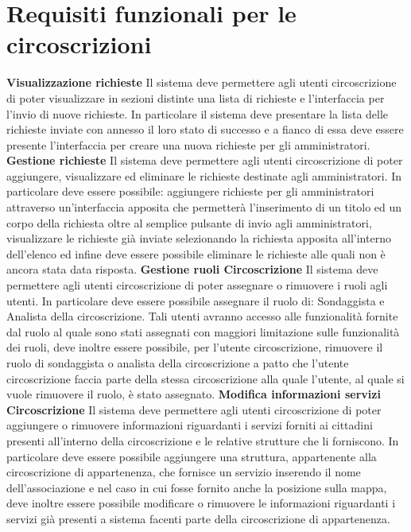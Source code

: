     \section{Requisiti funzionali per le circoscrizioni}
        \begin{rfList}
            \rfItem \textbf{Visualizzazione richieste} Il sistema deve permettere agli utenti circoscrizione di poter visualizzare in sezioni distinte una lista di richieste e l'interfaccia per l'invio di nuove richieste. In particolare il sistema deve presentare la lista delle richieste inviate con annesso il loro stato di successo e a fianco di essa deve essere presente l'interfaccia per creare una nuova richieste per gli amministratori.
            \rfItem \textbf{Gestione richieste} Il sistema deve permettere agli utenti circoscrizione di poter aggiungere, visualizzare ed eliminare le richieste destinate agli amministratori. In particolare deve essere possibile: aggiungere richieste per gli amministratori attraverso un'interfaccia apposita che permetterà l'inserimento di un titolo ed un corpo della richiesta oltre al semplice pulsante di invio agli amministratori, visualizzare le richieste già inviate selezionando la richiesta apposita all'interno dell'elenco ed infine deve essere possibile eliminare le richieste alle quali non è ancora stata data risposta.
            \rfItem \textbf{Gestione ruoli Circoscrizione} Il sistema deve permettere agli utenti circoscrizione di poter assegnare o rimuovere i ruoli agli utenti. In particolare deve essere possibile assegnare il ruolo di: Sondaggista e Analista della circoscrizione. Tali utenti avranno accesso alle funzionalità fornite dal ruolo al quale sono stati assegnati con maggiori limitazione sulle funzionalità dei ruoli, deve inoltre essere possibile, per l'utente circoscrizione, rimuovere il ruolo di sondaggista o analista della circoscrizione a patto che l'utente circoscrizione faccia parte della stessa circoscrizione alla quale l'utente, al quale si vuole rimuovere il ruolo, è stato assegnato.
            \rfItem \textbf{Modifica informazioni servizi Circoscrizione} Il sistema deve permettere agli utenti circoscrizione di poter aggiungere o rimuovere informazioni riguardanti i servizi forniti ai cittadini presenti all'interno della circoscrizione e le relative strutture che li forniscono. In particolare deve essere possibile aggiungere una struttura, appartenente alla circoscrizione di appartenenza, che fornisce un servizio inserendo il nome dell'associazione e nel caso in cui fosse fornito anche la posizione sulla mappa, deve inoltre essere possibile modificare o rimuovere le informazioni riguardanti i servizi già presenti a sistema facenti parte della circoscrizione di appartenenza.
        \end{rfList}

